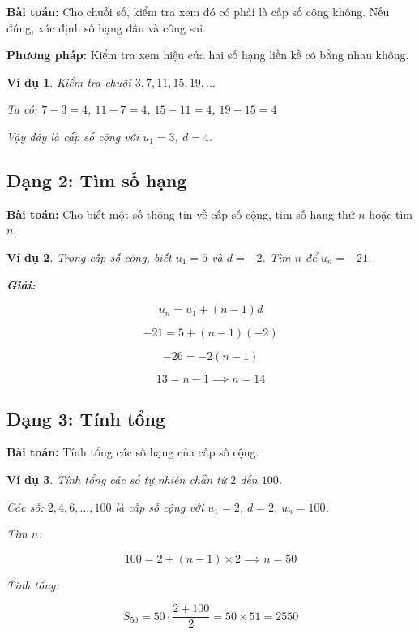 \documentclass[12pt,a4paper]{report}
\newtheorem{example}{Ví dụ}[section]
\begin{document}
\textbf{Bài toán:} Cho chuỗi số, kiểm tra xem đó có phải là cấp số cộng không. Nếu đúng, xác định số hạng đầu và công sai.

\textbf{Phương pháp:} Kiểm tra xem hiệu của hai số hạng liền kề có bằng nhau không.

\begin{example}
    Kiểm tra chuỗi $3, 7, 11, 15, 19, \dots$
    
    Ta có:
    $7 - 3 = 4$,
    $11 - 7 = 4$,
    $15 - 11 = 4$,
    $19 - 15 = 4$
    
    Vậy đây là cấp số cộng với $u_1 = 3$, $d = 4$.
\end{example}

\subsection{Dạng 2: Tìm số hạng}

\textbf{Bài toán:} Cho biết một số thông tin về cấp số cộng, tìm số hạng thứ $n$ hoặc tìm $n$.

\begin{example}
    Trong cấp số cộng, biết $u_1 = 5$ và $d = -2$. Tìm $n$ để $u_n = -21$.
    
    \textbf{Giải:}
    
    \[
        u_n = u_1 + (n - 1)d
    \]
    
    \[
        -21 = 5 + (n - 1)(-2)
    \]
    
    \[
        -26 = -2(n - 1)
    \]
    
    \[
        13 = n - 1 \implies n = 14
    \]
\end{example}

\subsection{Dạng 3: Tính tổng}

\textbf{Bài toán:} Tính tổng các số hạng của cấp số cộng.

\begin{example}
    Tính tổng các số tự nhiên chẵn từ $2$ đến $100$.
    
    Các số: $2, 4, 6, \dots, 100$ là cấp số cộng với
    $u_1 = 2$, $d = 2$, $u_n = 100$.
    
    Tìm $n$:
    
    \[
        100 = 2 + (n - 1) \times 2 \implies n = 50
    \]
    
    Tính tổng:
    
    \[
        S_{50} = 50 \cdot \frac{2 + 100}{2}
        = 50 \times 51 = 2550
    \]
\end{example}
\end{document}

